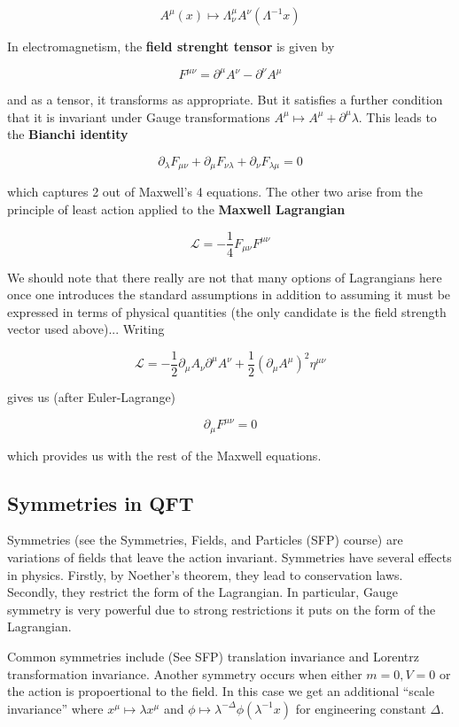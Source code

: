 \documentclass{article}
\theoremstyle{definition}
\begin{document}
$$ A^\mu(x) \mapsto \Lambda^\mu_\nu A^\nu(\Lambda^{-1} x) $$

In electromagnetism, the \textbf{field strenght tensor} is given by

$$ F^{\mu \nu} = \partial^\mu A^\nu - \partial^\nu A^\mu $$

and as a tensor, it transforms as appropriate. But it satisfies a further
condition that it is invariant under Gauge transformations $A^\mu \mapsto A^\mu
+ \partial^\mu \lambda$. This leads to the \textbf{Bianchi identity}

$$ \partial_\lambda F_{\mu \nu} + \partial_\mu F_{\nu \lambda} + \partial_\nu
F_{\lambda \mu} = 0 $$

which captures 2 out of Maxwell's 4 equations. The other two arise from the
principle of least action applied to the \textbf{Maxwell Lagrangian}

$$ \mathcal{L} = -\frac{1}{4} F_{\mu \nu} F^{\mu \nu} $$

We should note that there really are not that many options of Lagrangians here
once one introduces the standard assumptions in addition to assuming it must be
expressed in terms of physical quantities (the only candidate is the field
strength vector used above)... Writing

$$ \mathcal{L} = -\frac{1}{2} \partial_\mu A_\nu \partial^\mu A^\nu +
\frac{1}{2} (\partial_\mu A^\mu)^2 \eta^{\mu \nu} $$

gives us (after Euler-Lagrange)

$$ \partial_\mu F^{\mu \nu} = 0 $$

which provides us with the rest of the Maxwell equations.

\subsection{Symmetries in QFT}

Symmetries (see the Symmetries, Fields, and Particles (SFP) course) are variations of
fields that leave the action invariant. Symmetries have several effects in
physics. Firstly, by Noether's theorem, they lead to conservation laws.
Secondly, they restrict the form of the Lagrangian. In particular, Gauge
symmetry is very powerful due to strong restrictions it puts on the form of the
Lagrangian. 

Common symmetries include (See SFP) translation invariance and Lorentrz
transformation invariance. Another symmetry occurs when either $m = 0, V = 0$ or
the action is propoertional to the field. In this case we get an additional
``scale invariance'' where $x^\mu \mapsto \lambda x^\mu$ and $\phi \mapsto
\lambda^{-\Delta} \phi(\lambda^{-1}x)$ for engineering constant $\Delta$.
\end{document}
